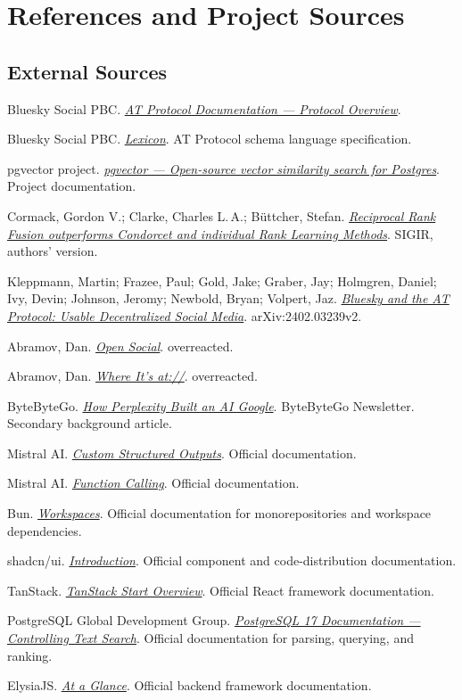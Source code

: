 \documentclass[11pt,a4paper]{article}
\newenvironment{reflist}{%
  \begin{list}{}{%
    \setlength{\labelwidth}{2.8em}%
    \setlength{\leftmargin}{3.4em}%
    \setlength{\labelsep}{0.6em}%
    \setlength{\itemsep}{0.25em}%
    \renewcommand{\makelabel}[1]{##1\hfil}}}
  {\end{list}}
\newcommand{\refitem}[1]{\item[\hypertarget{ref:#1}{[#1]}]}
\begin{document}
\section{References and Project Sources}

\subsection{External Sources}

\begin{reflist}
\refitem{L1} Bluesky Social PBC. \href{https://atproto.com/guides/overview}{\emph{AT Protocol Documentation --- Protocol Overview}}.
\refitem{L2} Bluesky Social PBC. \href{https://atproto.com/specs/lexicon}{\emph{Lexicon}}. AT Protocol schema language specification.
\refitem{L3} pgvector project. \href{https://github.com/pgvector/pgvector}{\emph{pgvector --- Open-source vector similarity search for Postgres}}. Project documentation.
\refitem{L4} Cormack, Gordon V.; Clarke, Charles L.\,A.; B\"uttcher, Stefan. \href{https://cormack.uwaterloo.ca/cormacksigir09-rrf.pdf}{\emph{Reciprocal Rank Fusion outperforms Condorcet and individual Rank Learning Methods}}. SIGIR, authors' version.
\refitem{L5} Kleppmann, Martin; Frazee, Paul; Gold, Jake; Graber, Jay; Holmgren, Daniel; Ivy, Devin; Johnson, Jeromy; Newbold, Bryan; Volpert, Jaz. \href{https://arxiv.org/html/2402.03239v2}{\emph{Bluesky and the AT Protocol: Usable Decentralized Social Media}}. arXiv:2402.03239v2.
\refitem{L6} Abramov, Dan. \href{https://overreacted.io/open-social/}{\emph{Open Social}}. overreacted.
\refitem{L7} Abramov, Dan. \href{https://overreacted.io/where-its-at/}{\emph{Where It's at://}}. overreacted.
\refitem{L8} ByteByteGo. \href{https://blog.bytebytego.com/p/how-perplexity-built-an-ai-google}{\emph{How Perplexity Built an AI Google}}. ByteByteGo Newsletter. Secondary background article.
\refitem{L9} Mistral AI. \href{https://docs.mistral.ai/studio/conversations/structured-output/custom}{\emph{Custom Structured Outputs}}. Official documentation.
\refitem{L10} Mistral AI. \href{https://docs.mistral.ai/studio/conversations/function-calling}{\emph{Function Calling}}. Official documentation.
\refitem{L11} Bun. \href{https://bun.sh/docs/pm/workspaces}{\emph{Workspaces}}. Official documentation for monorepositories and workspace dependencies.
\refitem{L12} shadcn/ui. \href{https://ui.shadcn.com/docs}{\emph{Introduction}}. Official component and code-distribution documentation.
\refitem{L13} TanStack. \href{https://tanstack.com/start/latest/docs/framework/react/overview}{\emph{TanStack Start Overview}}. Official React framework documentation.
\refitem{L14} PostgreSQL Global Development Group. \href{https://www.postgresql.org/docs/17/textsearch-controls.html}{\emph{PostgreSQL 17 Documentation --- Controlling Text Search}}. Official documentation for parsing, querying, and ranking.
\refitem{L15} ElysiaJS. \href{https://elysiajs.com/at-glance}{\emph{At a Glance}}. Official backend framework documentation.
\end{reflist}
\end{document}
